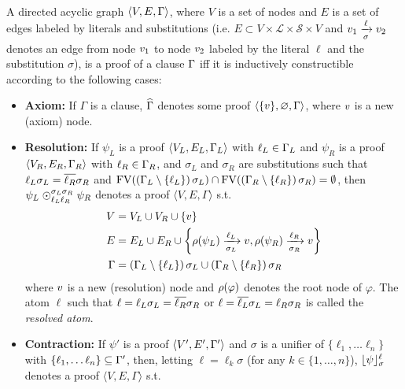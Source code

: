 \begin{definition} 
\label{def:proof} \hfill \\
A directed acyclic graph $\langle V, E, \clause \rangle$, where $V$ is a set of nodes and $E$ is a
set of edges labeled by literals and substitutions (i.e. $E \subset V \times \mathcal{L} \times \mathcal{S} \times V$ and $\n_1
\xrightarrow[\sigma]{\ell} \n_2$ denotes an edge from node $\n_1$ to node $\n_2$ labeled by the literal $\ell$ and the substitution $\sigma$), is a
proof of a clause $\clause$ iff it is inductively constructible according to the following cases:
%
\begin{itemize}
  \item \textbf{Axiom:} If $\Gamma$ is a clause, $\axiom{\Gamma}$ denotes some proof $\langle \{ \n \}, \varnothing,
    \Gamma \rangle$, where $\n$ is a new (axiom) node.
  \item \textbf{Resolution:} If $\psi_L$ is a proof $\langle V_L, E_L, \clause_L \rangle$ with $\ell_L \in \clause_L$ and
    $\psi_R$ is a proof $\langle V_R, E_R, \clause_R \rangle$ with $\ell_R \in \clause_R$, and 
    $\sigma_L$ and $\sigma_R$ are substitutions such that
    $\ell_L \sigma_L = \dual{\ell_R} \sigma_R$ and
    $\freevar{\left( \clause_L \setminus \left\{ \ell_L \right\} \right) \sigma_L} \cap 
     \freevar{\left( \clause_R
                    \setminus \left\{ \ell_R \right\} \right) \sigma_R} = \emptyset$, 
    then
    $\psi_L \res{\ell_L}{\sigma_L}{\ell_R}{\sigma_R} \psi_R$ denotes a proof $\langle V, E, \Gamma \rangle$ s.t.
    \begin{align*}
      V &= V_L \cup V_R \cup \{\n \} \\
      E &= E_L \cup E_R \cup
                    \left\{ \raiz{\psi_L} \xrightarrow[\sigma_L]{\ell_L} \n, 
                            \raiz{\psi_R} \xrightarrow[\sigma_R]{\ell_R} \n \right\} \\
     \Gamma &= \left( \clause_L \setminus \left\{ \ell_L \right\} \right) \sigma_L \cup \left( \clause_R
                    \setminus \left\{ \ell_R \right\} \right) \sigma_R 
    \end{align*}
    where $\n$ is a new (resolution) node and $\raiz{\varphi}$ denotes the root node of $\varphi$. The atom $\ell$ such that $\ell = \ell_L \sigma_L = \dual{\ell_R} \sigma_R$ or $\ell = \dual{\ell_L} \sigma_L = \ell_R \sigma_R$ is called the \emph{resolved atom}.
  \item \textbf{Contraction:} If $\psi'$ is a proof $\langle V', E', \clause' \rangle$ and $\sigma$ is a unifier of $\{\ell_1, \ldots \ell_n\}$ with $\{\ell_1, \ldots \ell_n\} \subseteq \clause'$, then, letting $\ell = \ell_k \sigma$ (for any $k \in \{1,\ldots, n\}$), $\con{\psi}{\sigma}{\ell}$ denotes a proof $\langle V, E, \Gamma \rangle$ s.t.

\end{itemize}
\end{definition}
